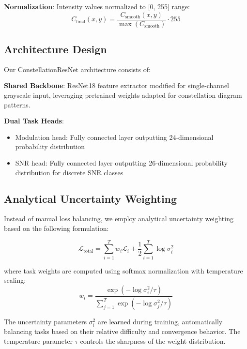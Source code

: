 \documentclass{ELSP}
\begin{document}
\textbf{Normalization}: Intensity values normalized to [0, 255] range:
\begin{equation}
C_{\text{final}}(x,y) = \frac{C_{\text{smooth}}(x,y)}{\max(C_{\text{smooth}})} \cdot 255
\end{equation}

\subsection{Architecture Design}

Our ConstellationResNet architecture consists of:

\textbf{Shared Backbone}: ResNet18 feature extractor modified for single‑channel grayscale input, leveraging pretrained weights adapted for constellation diagram patterns.

\textbf{Dual Task Heads}: 
\begin{itemize}
\item Modulation head: Fully connected layer outputting 24‑dimensional probability distribution
\item SNR head: Fully connected layer outputting 26‑dimensional probability distribution for discrete SNR classes
\end{itemize}

\subsection{Analytical Uncertainty Weighting}

Instead of manual loss balancing, we employ analytical uncertainty weighting \cite{liu2024analytical} based on the following formulation:

\begin{equation}
\mathcal{L}_{\text{total}} = \sum_{i=1}^{T} w_i \mathcal{L}_i + \frac{1}{2}\sum_{i=1}^{T} \log \sigma_i^2
\end{equation}

where task weights are computed using softmax normalization with temperature scaling:
\begin{equation}
w_i = \frac{\exp(-\log \sigma_i^2 / \tau)}{\sum_{j=1}^{T} \exp(-\log \sigma_j^2 / \tau)}
\end{equation}

The uncertainty parameters $\sigma_i^2$ are learned during training, automatically balancing tasks based on their relative difficulty and convergence behavior. The temperature parameter $\tau$ controls the sharpness of the weight distribution.
\end{document}

